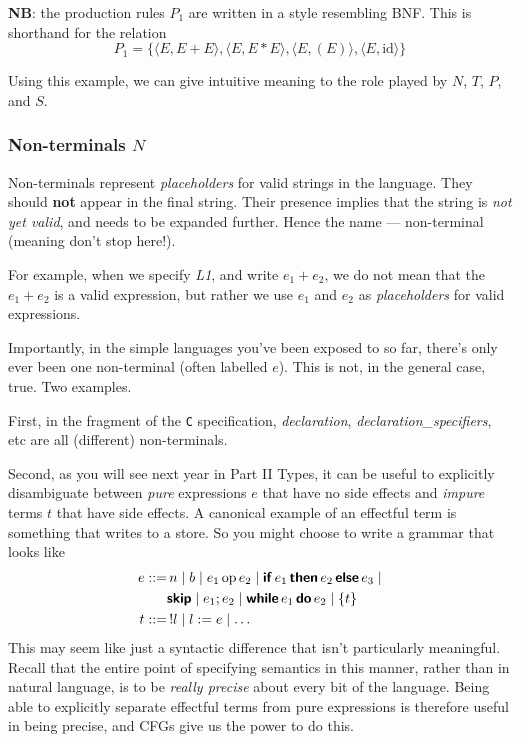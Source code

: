 \textbf{NB}: the production rules $P_1$ are written in a style resembling BNF. This is shorthand for the relation
\[P_1 = \{\langle E, E + E \rangle, \langle E, E * E \rangle, \langle E, (E) \rangle, \langle E, \text{id} \rangle\}\]

Using this example, we can give intuitive meaning to the role played by $N$, $T$, $P$, and $S$.

\subsubsection{Non-terminals $N$}
Non-terminals represent \textit{placeholders} for valid strings in the language. They should \textbf{not} appear in the final string. Their presence implies that the string is \textit{not yet valid}, and needs to be expanded further. Hence the name --- non-terminal (meaning don't stop here!). 
    
For example, when we specify \textit{L1}, and write $e_1 + e_2$, we do not mean that the $e_1 + e_2$ is a valid expression, but rather we use $e_1$ and $e_2$ as \textit{placeholders} for valid expressions.

Importantly, in the simple languages you've been exposed to so far, there's only ever been one non-terminal (often labelled $e$). This is not, in the general case, true. Two examples. 

First, in the fragment of the \texttt{C} specification, \textit{declaration}, \textit{declaration\_specifiers}, etc are all (different) non-terminals.

Second, as you will see next year in \textsf{Part II Types}, it can be useful to explicitly disambiguate between \textit{pure} expressions $e$ that have no side effects and \textit{impure} terms $t$ that have side effects. A canonical example of an effectful term is something that writes to a store. So you might choose to write a grammar that looks like
\begin{align*}
    e ::=& \, n \mid b \mid e_1 \, \text{op} \, e_2 \mid \textbf{\textsf{if}} \, e_1 \, \textbf{\textsf{then}} \, e_2 \, \textbf{\textsf{else}} \, e_3 \mid \\
    & \textbf{\textsf{skip}} \mid e_1 ; e_2 \mid \textbf{\textsf{while}} \, e_1 \, \textbf{\textsf{do}} \, e_2 \mid \{ t \} \\
    t ::= & \, !l \mid l := e \mid \ldots
\end{align*}
This may seem like just a syntactic difference that isn't particularly meaningful. Recall that the entire point of specifying semantics in this manner, rather than in natural language, is to be \textit{really precise} about every bit of the language. Being able to explicitly separate effectful terms from pure expressions is therefore useful in being precise, and CFGs give us the power to do this.

